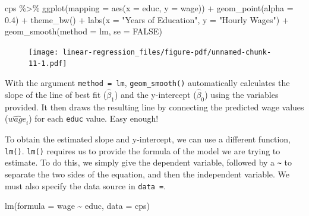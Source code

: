 \documentclass[
  letterpaper,
]{book}
\newenvironment{Shaded}{\begin{snugshade}}{\end{snugshade}}
\newcommand{\AttributeTok}[1]{\textcolor[rgb]{0.40,0.45,0.13}{#1}}
\newcommand{\ConstantTok}[1]{\textcolor[rgb]{0.56,0.35,0.01}{#1}}
\newcommand{\FloatTok}[1]{\textcolor[rgb]{0.68,0.00,0.00}{#1}}
\newcommand{\FunctionTok}[1]{\textcolor[rgb]{0.28,0.35,0.67}{#1}}
\newcommand{\NormalTok}[1]{\textcolor[rgb]{0.00,0.23,0.31}{#1}}
\newcommand{\SpecialCharTok}[1]{\textcolor[rgb]{0.37,0.37,0.37}{#1}}
\newcommand{\StringTok}[1]{\textcolor[rgb]{0.13,0.47,0.30}{#1}}
\begin{document}
\begin{Shaded}
\begin{Highlighting}[]
\NormalTok{cps }\SpecialCharTok{\%\textgreater{}\%}
  \FunctionTok{ggplot}\NormalTok{(}\AttributeTok{mapping =} \FunctionTok{aes}\NormalTok{(}\AttributeTok{x =}\NormalTok{ educ,}
                       \AttributeTok{y =}\NormalTok{ wage)) }\SpecialCharTok{+}
  \FunctionTok{geom\_point}\NormalTok{(}\AttributeTok{alpha =} \FloatTok{0.4}\NormalTok{) }\SpecialCharTok{+} \FunctionTok{theme\_bw}\NormalTok{() }\SpecialCharTok{+}
  \FunctionTok{labs}\NormalTok{(}\AttributeTok{x =} \StringTok{"Years of Education"}\NormalTok{,}
       \AttributeTok{y =} \StringTok{"Hourly Wages"}\NormalTok{) }\SpecialCharTok{+}
  \FunctionTok{geom\_smooth}\NormalTok{(}\AttributeTok{method =}\NormalTok{ lm, }\AttributeTok{se =} \ConstantTok{FALSE}\NormalTok{)}
\end{Highlighting}
\end{Shaded}

\begin{figure}[H]

{\centering \texttt{[image: linear-regression\_files/figure-pdf/unnamed-chunk-11-1.pdf]}

}

\end{figure}

With the argument \texttt{method\ =\ lm}, \texttt{geom\_smooth()}
automatically calculates the slope of the line of best fit
(\(\hat{\beta}_{1}\)) and the y-intercept (\(\hat{\beta}_{0}\)) using
the variables provided. It then draws the resulting line by connecting
the predicted wage values (\(\widehat{\textit{wage}_i}\)) for each
\texttt{educ} value. Easy enough!

To obtain the estimated slope and y-intercept, we can use a different
function, \texttt{lm()}. \texttt{lm()} requires us to provide the
formula of the model we are trying to estimate. To do this, we simply
give the dependent variable, followed by a \texttt{\textasciitilde{}} to
separate the two sides of the equation, and then the independent
variable. We must also specify the data source in \texttt{data\ =}.

\begin{Shaded}
\begin{Highlighting}[]
\FunctionTok{lm}\NormalTok{(}\AttributeTok{formula =}\NormalTok{ wage }\SpecialCharTok{\textasciitilde{}}\NormalTok{ educ, }\AttributeTok{data =}\NormalTok{ cps)}
\end{Highlighting}
\end{Shaded}
\end{document}
